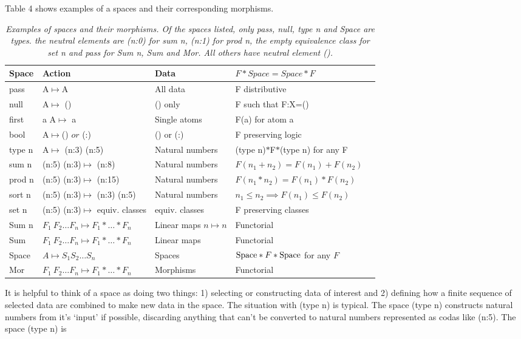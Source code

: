 \documentclass[11pt]{article}
\begin{document}
Table 4 shows examples of a spaces and their corresponding morphisms.
\begin{table}
\begin{tabular}{| l | l | l | l | l |  }
Space & Action & Data &  $F*Space=Space*F$ \\
\hline
pass & A$\mapsto$A & All data & F distributive \\
null & A$\mapsto$ () & () only & F such that F:X=() \\
first & a A$\mapsto$ a & Single atoms &  F(a) for atom a \\
bool & A$\mapsto$() $or$ (:) & () or (:) &  F preserving logic \\
type n & A$\mapsto$ (n:3) (n:5) & Natural numbers &  (type n)$*$F$*$(type n) for any F \\
sum n & (n:5) (n:3)$\mapsto$ (n:8) & Natural numbers &  $F(n_1+n_2)=F(n_1)+F(n_2)$ \\
prod n & (n:5) (n:3)$\mapsto$ (n:15) & Natural numbers &  $F(n_1*n_2)=F(n_1)*F(n_2)$ \\
sort n & (n:5) (n:3)$\mapsto$ (n:3) (n:5) & Natural numbers & $n_1\le n_2 \implies F(n_1)\le F(n_2)$ \\
set n & (n:5) (n:3)$\mapsto$ equiv. classes & equiv. classes & F preserving classes \\
Sum n & $F_1\ F_2\dots F_n\mapsto F_1*\dots *F_n$ & Linear maps $n\mapsto n$ & Functorial \\
Sum & $F_1\ F_2\dots F_n\mapsto F_1*\dots *F_n$ & Linear maps  & Functorial \\
Space & $A\mapsto S_1 S_2\dots S_n$ & Spaces & ${\rm Space}*F*{\rm Space}$ for any $F$\\
Mor & $F_1\ F_2\dots F_n\mapsto F_1*\dots *F_n$ & Morphisms & Functorial \\
\hline
\end{tabular}
\caption{{\it Examples of spaces and their morphisms.  Of the spaces listed, only pass, null, type n and Space are types.
the neutral elements are (n:0) for sum n, (n:1) for prod n, the empty equivalence class for set n and pass for Sum n, Sum and Mor.  All others have neutral element ().}}
\end{table}
It is helpful to think of a space as doing two things:  1) selecting or constructing data of interest and 2) defining how
a finite sequence of selected data are combined to make new data in the space.
The situation with (type n) is typical.  The space (type n) constructs natural numbers from it's `input' if possible,
discarding anything that can't be converted to natural numbers represented as codas like (n:5).  The space (type n) is
\end{document}
